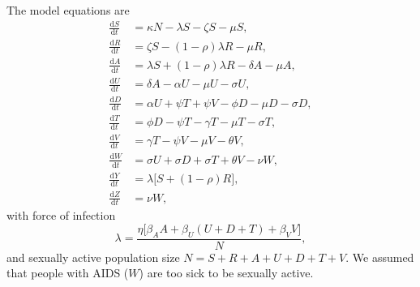 \documentclass{article}
\newcommand{\md}{\mathrm{d}}
\begin{document}
The model equations are
\begin{equation}
  \label{model_eqns}
  \begin{split}
    \frac{\md S}{\md t} &= \kappa N - \lambda S - \zeta S- \mu S,
    \\
    \frac{\md R}{\md t} & = \zeta S - (1 - \rho) \lambda R - \mu R,
    \\
    \frac{\md A}{\md t} &= \lambda S + (1 - \rho) \lambda R - \delta A - \mu A,
    \\
    \frac{\md U}{\md t} &= \delta A - \alpha U - \mu U - \sigma U,
    \\
    \frac{\md D}{\md t} &=  \alpha U + \psi T + \psi V
    - \phi D - \mu D - \sigma D,
    \\
    \frac{\md T}{\md t} &= \phi D - \psi T - \gamma T - \mu T
    - \sigma T,
    \\
    \frac{\md V}{\md t} &= \gamma T - \psi V - \mu V - \theta V,
    \\
    \frac{\md W}{\md t} &= \sigma U + \sigma D + \sigma T + \theta V -
    \nu W,
    \\
    \frac{\md Y}{\md t} &= \lambda \big[S + (1 - \rho) R\big],
    \\
    \frac{\md Z}{\md t} &= \nu W,
  \end{split}
\end{equation}
with force of infection
\begin{equation}
  \label{force_of_infection}
  \lambda =
  \frac{\eta \big[\beta_A A + \beta_U (U + D + T) + \beta_V V\big]}{N},
\end{equation}
and sexually active population size $N = S + R + A + U + D + T + V$.
We assumed that people with AIDS ($W$) are too sick to be sexually
active.
\end{document}
